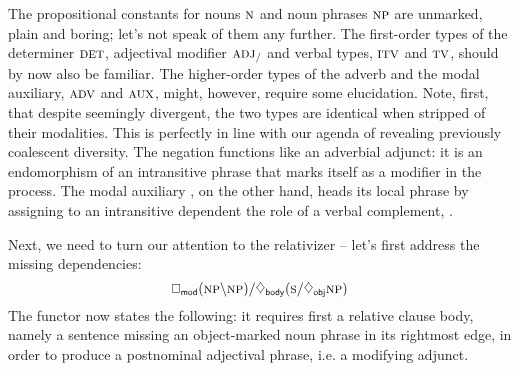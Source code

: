 The propositional constants for nouns $\n[s]$ and noun phrases $\np[s]$ are unmarked, plain and boring; let's not speak of them any further.
The first-order types of the determiner $\textsc{\normalfont\textsc{det}}$, adjectival modifier $\textsc{\normalfont\textsc{adj}}_{/}$ and verbal types, $\textsc{\normalfont\textsc{itv}}$ and $\textsc{\normalfont\textsc{tv}}$, should by now also be familiar.
The higher-order types of the adverb and the modal auxiliary, $\textsc{\normalfont\textsc{adv}}$ and $\textsc{\normalfont\textsc{aux}}$, might, however, require some elucidation.
Note, first, that despite seemingly divergent, the two types are identical when stripped of their modalities.
This is perfectly in line with our agenda of revealing previously coalescent diversity.
The negation  functions like an adverbial adjunct: it is an endomorphism of an intransitive phrase that marks itself as a modifier in the process.
The modal auxiliary , on the other hand, heads its local phrase by assigning to an intransitive dependent the role of a verbal complement, .

Next, we need to turn our attention to the relativizer -- let's first address the missing dependencies:
\begin{equation}
\dbox{mod}(\np\divleft\np)\divright\ddia{body}(\s\divright\ddia{obj}\np)\label{equation:deprel}
\end{equation}
The functor now states the following: it requires first a relative clause body, namely a sentence missing an object-marked noun phrase in its rightmost edge, in order to produce a postnominal adjectival phrase, i.e. a modifying adjunct.

